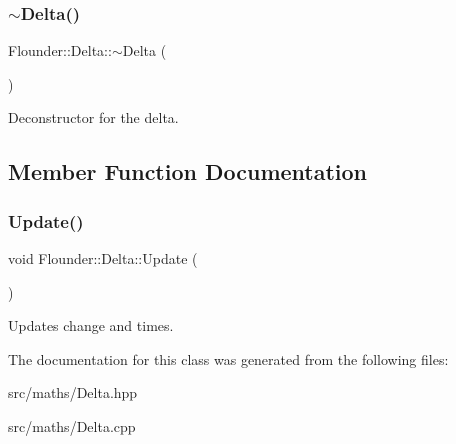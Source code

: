 \mbox{\label{class_flounder_1_1_delta_a1dfd186406e464b12af300ac0141858e}} 
\subsubsection{\texorpdfstring{$\sim$\+Delta()}{~Delta()}}
{\footnotesize\ttfamily Flounder\+::\+Delta\+::$\sim$\+Delta (\begin{DoxyParamCaption}{ }\end{DoxyParamCaption})}



Deconstructor for the delta. 



\subsection{Member Function Documentation}
\mbox{\label{class_flounder_1_1_delta_ad6f9a487cf22f4e3b4303bbfbfd556fb}} 
\subsubsection{\texorpdfstring{Update()}{Update()}}
{\footnotesize\ttfamily void Flounder\+::\+Delta\+::\+Update (\begin{DoxyParamCaption}{ }\end{DoxyParamCaption})}



Updates change and times. 



The documentation for this class was generated from the following files\+:\begin{DoxyCompactItemize}
\item 
src/maths/Delta.\+hpp\item 
src/maths/Delta.\+cpp\end{DoxyCompactItemize}
